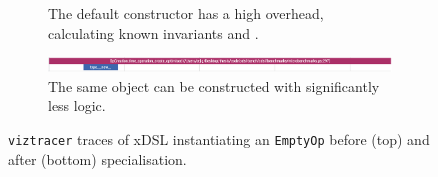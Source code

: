 \begin{figure}[H]
    \centering
    \begin{subfigure}[b]{\textwidth}
        \centering
        \captionsetup{width=0.8\textwidth}
        \caption{The default constructor has a high overhead, calculating known invariants and .}
        \label{fig:ubenchmark-hastrait-xdsl-viztracer}
    \end{subfigure}
    \begin{subfigure}[b]{\textwidth}
        \centering
        \includegraphics[width=\textwidth]{images/specialising_optimising_xdsl_rewriting/optimised_empty_create}
        \captionsetup{width=0.8\textwidth}
        \caption{The same object can be constructed with significantly less logic.}
        \label{fig:ubenchmark-gettrait-xdsl-viztracer}
    \end{subfigure}
    \caption{\texttt{viztracer} traces of xDSL instantiating an \texttt{EmptyOp} before (top) and after (bottom) specialisation.}
    \label{fig:ubenchmark-hasgettrait-xdsl-viztracer}
\end{figure}

